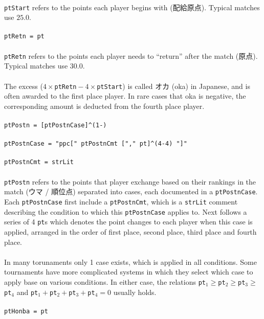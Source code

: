\documentclass[%
	a4paper%
	,10pt%
	,twoside%
	,notitlepage%
]{article}%
\newcommand*{\ruleSymbol}{\textjapanese{⚠}}%
\newcommand*{\ruleMargin}{\marginpar{\flushright{}\ruleSymbol{}}}%
\newcommand*{\rulePar}{\paragraph*{\ruleMargin{}}}%
\begin{document}
			\paragraph*{}\lstinline/ptStart/ refers to the points each player begins with (\textjapanese{配給原点}). Typical matches use $25.0$. %
			\rulePar{}\lstinline/ptRetn = pt/%
			\paragraph*{}\lstinline/ptRetn/ refers to the points each player needs to ``return'' after the match (\textjapanese{原点}). Typical matches use $30.0$. %
			\paragraph*{}The excess ($4 \times{} {}$\lstinline/ptRetn/${} - 4 \times{} {}$\lstinline/ptStart/) is called \textjapanese{オカ} (oka) in Japanese, and is often awarded to the first place player. In rare cases that oka is negative, the corresponding amount is deducted from the fourth place player. %
			\rulePar{}\lstinline/ptPostn = [ptPostnCase]^(1-)/%
			\rulePar{}\lstinline/ptPostnCase = "ppc[" ptPostnCmt ["," pt]^(4-4) "]"/%
			\rulePar{}\lstinline/ptPostnCmt = strLit/%
			\paragraph*{}\lstinline/ptPostn/ refers to the points that player exchange based on their rankings in the match (\textjapanese{ウマ} / \textjapanese{順位点}) separated into cases, each documented in a \lstinline/ptPostnCase/. Each \lstinline/ptPostnCase/ first include a \lstinline/ptPostnCmt/, which is a \lstinline/strLit/ comment describing the condition to which this \lstinline/ptPostnCase/ applies to. Next follows a series of 4 \lstinline/pt/s which denotes the point changes to each player when this case is applied, arranged in the order of first place, second place, third place and fourth place. %
			\paragraph*{}In many torunaments only 1 case exists, which is applied in all conditions. Some tournaments have more complicated systems in which they select which case to apply base on various conditions. In either case, the relations \lstinline/pt/${}_1 \geq{} {}$\lstinline/pt/${}_2 \geq{} {}$\lstinline/pt/${}_3 \geq{} {}$\lstinline/pt/${}_4$ and \lstinline/pt/${}_1 + {}$\lstinline/pt/${}_2 + {}$\lstinline/pt/${}_3 + {}$\lstinline/pt/${}_4 = 0$ usually holds. %
			\rulePar{}\lstinline/ptHonba = pt/%
\end{document}
